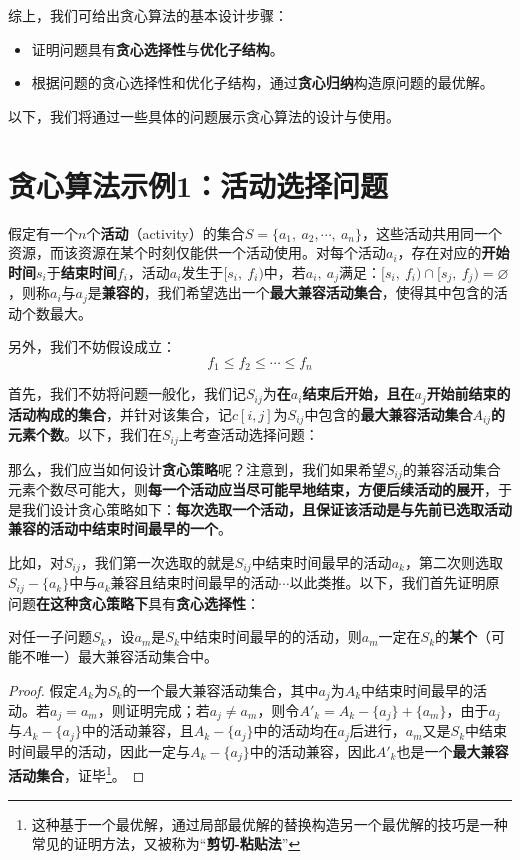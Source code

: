 \documentclass[12pt,a4paper,violet,oneside]{bbe}
\begin{document}
综上，我们可给出贪心算法的基本设计步骤：
\begin{itemize}
	\item 证明问题具有\textbf{贪心选择性}与\textbf{优化子结构}。
	\item 根据问题的贪心选择性和优化子结构，通过\textbf{贪心归纳}构造原问题的最优解。
\end{itemize}

以下，我们将通过一些具体的问题展示贪心算法的设计与使用。
\section{贪心算法示例1：活动选择问题}
\begin{example}
	假定有一个$n$个\textbf{活动}（activity）的集合$S=\{a_1,~a_2,\cdots,~a_n\}$，这些活动共用同一个资源，而该资源在某个时刻仅能供一个活动使用。对每个活动$a_i$，存在对应的\textbf{开始时间}$s_i$于\textbf{结束时间}$f_i$，活动$a_i$发生于$[s_i,~f_i)$中，若$a_i,~a_j$满足：$[s_i,~f_i)\cap[s_j,~f_j)=\varnothing$，则称$a_i$与$a_j$是\textbf{兼容的}，我们希望选出一个\textbf{最大兼容活动集合}，使得其中包含的活动个数最大。
	
	另外，我们不妨假设成立：
	$$
	f_1\leqslant f_2\leqslant\cdots\leqslant f_n
	$$
\end{example}

首先，我们不妨将问题一般化，我们记$S_{ij}$为\textbf{在$a_i$结束后开始，且在$a_j$开始前结束的活动构成的集合}，并针对该集合，记$c[i,j]$为$S_{ij}$中包含的\textbf{最大兼容活动集合$A_{ij}$的元素个数}。以下，我们在$S_{ij}$上考查活动选择问题：

那么，我们应当如何设计\textbf{贪心策略}呢？注意到，我们如果希望$S_{ij}$的兼容活动集合元素个数尽可能大，则\textbf{每一个活动应当尽可能早地结束，方便后续活动的展开}，于是我们设计贪心策略如下：\textbf{每次选取一个活动，且保证该活动是与先前已选取活动兼容的活动中结束时间最早的一个}。

比如，对$S_{ij}$，我们第一次选取的就是$S_{ij}$中结束时间最早的活动$a_k$，第二次则选取$S_{ij}-\{a_k\}$中与$a_k$兼容且结束时间最早的活动$\cdots$以此类推。以下，我们首先证明原问题\textbf{在这种贪心策略下}具有\textbf{贪心选择性}：
\begin{lemma}
	对任一子问题$S_k$，设$a_m$是$S_k$中结束时间最早的的活动，则$a_m$一定在$S_k$的\textbf{某个}（可能不唯一）最大兼容活动集合中。
\end{lemma}

\begin{proof}
	假定$A_k$为$S_k$的一个最大兼容活动集合，其中$a_j$为$A_k$中结束时间最早的活动。若$a_j=a_m$，则证明完成；若$a_j\ne a_m$，则令$A'_k=A_k-\{a_j\}+\{a_m\}$，由于$a_j$与$A_k-\{a_j\}$中的活动兼容，且$A_k-\{a_j\}$中的活动均在$a_j$后进行，$a_m$又是$S_k$中结束时间最早的活动，因此一定与$A_k-\{a_j\}$中的活动兼容，因此$A'_k$也是一个\textbf{最大兼容活动集合}，证毕\footnote{这种基于一个最优解，通过局部最优解的替换构造另一个最优解的技巧是一种常见的证明方法，又被称为“\textbf{剪切-粘贴法}”}。
\end{proof}
\end{document}
